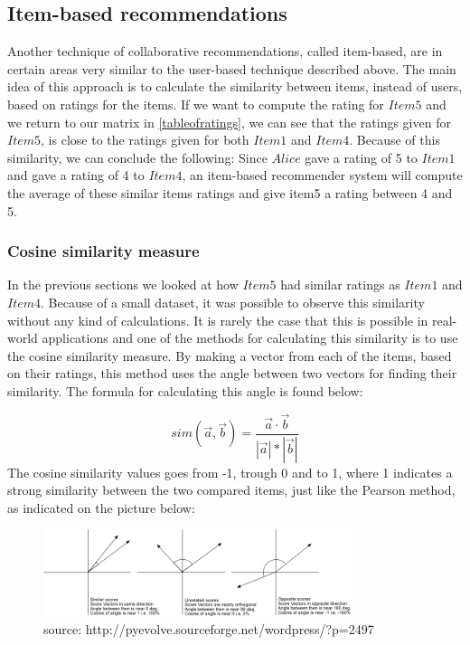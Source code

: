 \subsection{Item-based recommendations} %
\label{sub:item_based_recommendations}
Another technique of collaborative recommendations, called item-based, are in certain areas very similar to the user-based technique described above. The main idea of this approach is to calculate the similarity between items, instead of users, based on ratings for the items. If we want to compute the rating for \(Item5\) and we return to our matrix in \ref{tableofratings}, we can see that the ratings given for \(Item5\), is close to the ratings given for both \(Item1\) and \(Item4\). Because of this similarity, we can conclude the following: Since \(Alice\) gave a rating of 5 to \(Item1\) and gave a rating of 4 to \(Item4\), an item-based recommender system will compute the average of these similar items ratings and give item5 a rating between 4 and 5.

\subsubsection{Cosine similarity measure}
In the previous sections we looked at how \(Item5\) had similar ratings as \(Item1\) and \(Item4\). Because of a small dataset, it was possible to observe this similarity without any kind of calculations. It is rarely the case that this is possible in real-world applications and one of the methods for calculating this similarity is to use the cosine similarity measure. \newline 
By making a vector from each of the items, based on their ratings, this method uses the angle between two vectors for finding their similarity. The formula for calculating this angle is found below:

\[
	sim(\vec{a}, \vec{b}) = \frac{\vec{a} \cdot \vec{b}}{|\vec{a}| * |\vec{b}| }
\]
\newline
The cosine similarity values goes from -1, trough 0 and to 1, where 1 indicates a strong similarity between the two compared items, just like the Pearson method, as indicated on the picture below:

\begin{figure}[H]
\centering
\includegraphics[width=90mm]{Pictures/cosinesimilarity.png}
\caption{source: http://pyevolve.sourceforge.net/wordpress/?p=2497}
\label{cosinesimilarity}
\end{figure}

